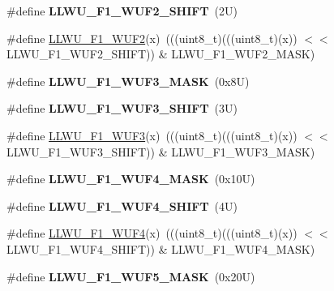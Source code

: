 \begin{DoxyCompactItemize}
\#define {\bfseries L\+L\+W\+U\+\_\+\+F1\+\_\+\+W\+U\+F2\+\_\+\+S\+H\+I\+FT}~(2\+U)
\item 
\#define \mbox{\hyperlink{group___l_l_w_u___register___masks_ga7baf252acb15c1af560212b69c4510b2}{L\+L\+W\+U\+\_\+\+F1\+\_\+\+W\+U\+F2}}(x)~(((uint8\+\_\+t)(((uint8\+\_\+t)(x)) $<$$<$ L\+L\+W\+U\+\_\+\+F1\+\_\+\+W\+U\+F2\+\_\+\+S\+H\+I\+FT)) \& L\+L\+W\+U\+\_\+\+F1\+\_\+\+W\+U\+F2\+\_\+\+M\+A\+SK)
\item 
\mbox{\label{group___l_l_w_u___register___masks_ga7c81d1a3309d56f967355042ac08c299}} 
\#define {\bfseries L\+L\+W\+U\+\_\+\+F1\+\_\+\+W\+U\+F3\+\_\+\+M\+A\+SK}~(0x8\+U)
\item 
\mbox{\label{group___l_l_w_u___register___masks_gada64305bc36dde8d293f511de2183d0c}} 
\#define {\bfseries L\+L\+W\+U\+\_\+\+F1\+\_\+\+W\+U\+F3\+\_\+\+S\+H\+I\+FT}~(3\+U)
\item 
\#define \mbox{\hyperlink{group___l_l_w_u___register___masks_ga239699d31d2e283bf2edce04eb6e4636}{L\+L\+W\+U\+\_\+\+F1\+\_\+\+W\+U\+F3}}(x)~(((uint8\+\_\+t)(((uint8\+\_\+t)(x)) $<$$<$ L\+L\+W\+U\+\_\+\+F1\+\_\+\+W\+U\+F3\+\_\+\+S\+H\+I\+FT)) \& L\+L\+W\+U\+\_\+\+F1\+\_\+\+W\+U\+F3\+\_\+\+M\+A\+SK)
\item 
\mbox{\label{group___l_l_w_u___register___masks_ga9dad2dc81874baa09dac37d10cc4781d}} 
\#define {\bfseries L\+L\+W\+U\+\_\+\+F1\+\_\+\+W\+U\+F4\+\_\+\+M\+A\+SK}~(0x10\+U)
\item 
\mbox{\label{group___l_l_w_u___register___masks_ga4ce65dd6db7f89bd5e6f0fb7df47a399}} 
\#define {\bfseries L\+L\+W\+U\+\_\+\+F1\+\_\+\+W\+U\+F4\+\_\+\+S\+H\+I\+FT}~(4\+U)
\item 
\#define \mbox{\hyperlink{group___l_l_w_u___register___masks_ga9c07a536d420eeb46f7a757d4449f2ac}{L\+L\+W\+U\+\_\+\+F1\+\_\+\+W\+U\+F4}}(x)~(((uint8\+\_\+t)(((uint8\+\_\+t)(x)) $<$$<$ L\+L\+W\+U\+\_\+\+F1\+\_\+\+W\+U\+F4\+\_\+\+S\+H\+I\+FT)) \& L\+L\+W\+U\+\_\+\+F1\+\_\+\+W\+U\+F4\+\_\+\+M\+A\+SK)
\item 
\mbox{\label{group___l_l_w_u___register___masks_ga2ba67283979e853e1601bd15a534523e}} 
\#define {\bfseries L\+L\+W\+U\+\_\+\+F1\+\_\+\+W\+U\+F5\+\_\+\+M\+A\+SK}~(0x20\+U)
$$
\end{DoxyCompactItemize}
